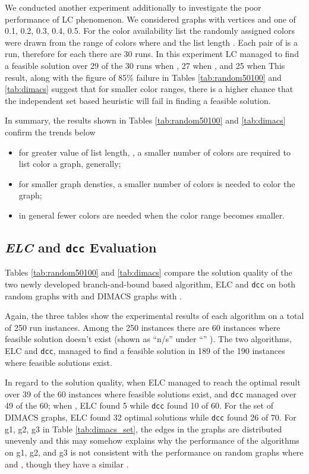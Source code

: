 \documentclass[10pt]{article}
\begin{document}
We conducted another experiment additionally to investigate the poor performance of LC phenomenon.  
We considered graphs with
 vertices and  one
of 0.1, 0.2, 0.3, 0.4, 0.5.  For the color availability list the randomly 
assigned colors were drawn from the range of colors  where 
and the list length . Each pair of  is a run, therefore for each  
there are 30 runs. 
In this experiment LC managed to find a feasible 
solution over 29 of the 30 runs when , 27 when , and 25 when 
This result, along with the figure of 85\% failure in Tables \ref{tab:random50100} and \ref{tab:dimacs} 
 suggest that for smaller color ranges, there is a higher chance that the independent set based heuristic will
fail in finding a feasible solution. 

In summary, the results shown in Tables \ref{tab:random50100} and \ref{tab:dimacs} confirm the trends below
\begin{itemize}
\item for greater value of list length, , a smaller number of
  colors are required to list color a graph, generally;
\item for smaller graph densties, a smaller number of colors is needed
  to color the graph;
\item in general fewer colors are needed when the color range becomes
  smaller.
\end{itemize}





\subsection{\textit{ELC} and \texttt{dcc} Evaluation} \label{sec:elc}

Tables \ref{tab:random50100} and \ref{tab:dimacs} compare the solution quality of the two
newly developed branch-and-bound based algorithm,  ELC and \texttt{dcc} on both random graphs with  and DIMACS graphs
with .

Again, the three tables show the experimental results of each algorithm on a total of 250 run instances. Among 
 the 250 instances there are 60 instances where feasible solution doesn't exist (shown as ``n/s'' under ``'' ).
The two algorithms, ELC and \texttt{dcc}, managed to find a feasible solution in 189 of the 190 instances where 
feasible solutions exist. 

In regard to the solution quality, when  ELC managed to reach the optimal result over 39 of the 60 
instances where feasible solutions exist, and \texttt{dcc} managed over 49 of the 60; when , ELC found 5 while \texttt{dcc} found 
10 of 60. For the set of DIMACS graphs, ELC found 32 optimal solutions while \texttt{dcc} found 26 of 70. For g1, g2, g3 in 
Table \ref{tab:dimacs_set}, the edges in the graphs are distributed unevenly and this may somehow explains why the performance
of the algorithms on g1, g2, and g3 is not consistent with the performance on random graphs where  and , though they have a similar . 
\end{document}
